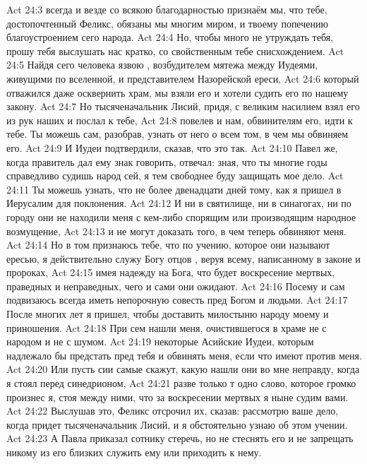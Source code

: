 \vs Act 24:3 всегда и везде со всякою благодарностью признаём мы, что тебе, достопочтенный Феликс, обязаны мы многим миром, и твоему попечению благоустроением сего народа.
\vs Act 24:4 Но, чтобы много не утруждать тебя, прошу тебя выслушать нас кратко, со свойственным тебе снисхождением.
\vs Act 24:5 Найдя сего человека язвою , возбудителем мятежа между Иудеями, живущими по вселенной, и представителем Назорейской ереси,
\vs Act 24:6 который отважился даже осквернить храм, мы взяли его и хотели судить его по нашему закону.
\vs Act 24:7 Но тысяченачальник Лисий, придя, с великим насилием взял его из рук наших и послал к тебе,
\vs Act 24:8 повелев и нам, обвинителям его, идти к тебе. Ты можешь сам, разобрав, узнать от него о всем том, в чем мы обвиняем его.
\vs Act 24:9 И Иудеи подтвердили, сказав, что это так.
\rsbpar\vs Act 24:10 Павел же, когда правитель дал ему знак говорить, отвечал: зная, что ты многие годы справедливо судишь народ сей, я тем свободнее буду защищать мое дело.
\vs Act 24:11 Ты можешь узнать, что не более двенадцати дней тому, как я пришел в Иерусалим для поклонения.
\vs Act 24:12 И ни в святилище, ни в синагогах, ни по городу они не находили меня с кем-либо спорящим или производящим народное возмущение,
\vs Act 24:13 и не могут доказать того, в чем теперь обвиняют меня.
\vs Act 24:14 Но в том признаюсь тебе, что по учению, которое они называют ересью, я действительно служу Богу отцов , веруя всему, написанному в законе и пророках,
\vs Act 24:15 имея надежду на Бога, что будет воскресение мертвых, праведных и неправедных, чего и сами они ожидают.
\vs Act 24:16 Посему и сам подвизаюсь всегда иметь непорочную совесть пред Богом и людьми.
\vs Act 24:17 После многих лет я пришел, чтобы доставить милостыню народу моему и приношения.
\vs Act 24:18 При сем нашли меня, очистившегося в храме не с народом и не с шумом.
\vs Act 24:19  некоторые Асийские Иудеи, которым надлежало бы предстать пред тебя и обвинять меня, если что имеют против меня.
\vs Act 24:20 Или пусть сии самые скажут, какую нашли они во мне неправду, когда я стоял перед синедрионом,
\vs Act 24:21 разве только т одно слово, которое громко произнес я, стоя между ними, что за  воскресении мертвых я ныне судим вами.
\rsbpar\vs Act 24:22 Выслушав это, Феликс отсрочил  их, сказав: рассмотрю ваше дело, когда придет тысяченачальник Лисий, и я обстоятельно узнаю об этом учении.
\vs Act 24:23 А Павла приказал сотнику стеречь, но не стеснять его и не запрещать никому из его близких служить ему или приходить к нему.
